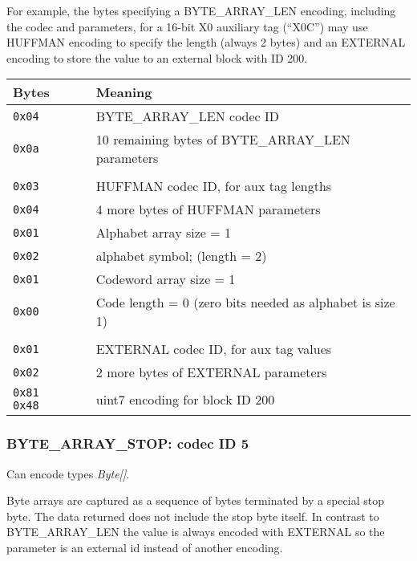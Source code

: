 \documentclass[a4paper]{article}
\begin{document}
For example, the bytes specifying a BYTE\_ARRAY\_LEN encoding, including the codec and parameters, for a 16-bit X0 auxiliary tag (``X0C'') may use HUFFMAN encoding to specify the length (always 2 bytes) and an EXTERNAL encoding to store the value to an external block with ID 200.

\begin{tabular}{lll}
\hline
\textbf{Bytes} & & \textbf{Meaning}\\
\hline
\texttt{0x04}         & & BYTE\_ARRAY\_LEN codec ID                                    \\
\texttt{0x0a}         & & 10 remaining bytes of BYTE\_ARRAY\_LEN parameters            \\
\\
\texttt{0x03}         & & HUFFMAN codec ID, for aux tag lengths                        \\
\texttt{0x04}         & & 4 more bytes of HUFFMAN parameters                           \\
\texttt{0x01}         & & Alphabet array size = 1                                      \\
\texttt{0x02}         & & alphabet symbol; (length = 2)                                \\
\texttt{0x01}         & & Codeword array size = 1                                      \\
\texttt{0x00}         & & Code length = 0 (zero bits needed as alphabet is size 1)     \\
\\
\texttt{0x01}         & & EXTERNAL codec ID, for aux tag values                        \\
\texttt{0x02}         & & 2 more bytes of EXTERNAL parameters                          \\
\texttt{0x81 0x48}    & & uint7 encoding for block ID 200                              \\
\hline
\end{tabular}

\subsubsection*{BYTE\_ARRAY\_STOP: codec ID 5}

Can encode types \textit{Byte[]}.

Byte arrays are captured as a sequence of bytes terminated by a special stop byte.
The data returned does not include the stop byte itself.
In contrast to BYTE\_ARRAY\_LEN the value is always encoded with EXTERNAL so the parameter is an external id instead of another encoding.
\end{document}
